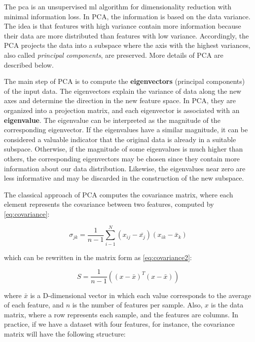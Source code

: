 The \acf{pca} \citep{pca} is an unsupervised \acl{ml} algorithm for dimensionality reduction with minimal information loss. In PCA, the information is based on the data variance. The idea is that features with high variance contain more information because their data are more distributed than features with low variance. Accordingly, the PCA projects the data into a subspace where the axis with the highest variances, also called \textit{principal components}, are preserved. More details of PCA are described below.

The main step of PCA is to compute the \textbf{eigenvectors} (principal components) of the input data. The eigenvectors explain the variance of data along the new axes and determine the direction in the new feature space. In PCA, they are organized into a projection matrix, and each eigenvector is associated with an \textbf{eigenvalue}. The eigenvalue can be interpreted as the magnitude of the corresponding eigenvector. If the eigenvalues have a similar magnitude, it can be considered a valuable indicator that the original data is already in a suitable subspace. Otherwise, if the magnitude of some eigenvalues is much higher than others, the corresponding eigenvectors may be chosen since they contain more information about our data distribution. Likewise, the eigenvalues near zero are less informative and may be discarded in the construction of the new subspace. 

The classical approach of PCA computes the covariance matrix, where each element represents the covariance between two features, computed by \autoref{eq:covariance}:

\begin{equation}
\label{eq:covariance}
\sigma_{jk} = \frac{1}{n-1}\sum_{i-1}^{N}(x_{ij} - \bar{x_j})(x_{ik} - \bar{x}_k)
\end{equation}

\noindent
which can be rewritten in the matrix form as \autoref{eq:covariance2}:

\begin{equation}
\label{eq:covariance2}
S = \frac{1}{n-1}((x - \bar{x})^T(x - \bar{x}))
\end{equation}

\noindent
where $\bar{x}$ is a D-dimensional vector in which each value corresponds to the average of each feature, and $n$ is the number of features per sample. Also, $x$ is the data matrix, where a row represents each sample, and the features are columns. In practice, if we have a dataset with four features, for instance, the covariance matrix will have the following structure:

